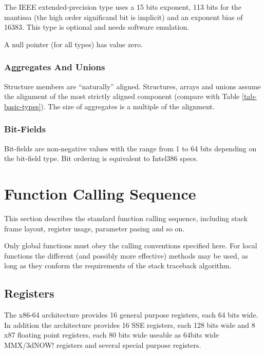 The IEEE extended-precision type uses a 15 bits exponent, 113 bits for
the mantissa (the high order significand bit is implicit) and an
exponent bias of 16383.  This type is optional and needs software
emulation.

A null pointer (for all types) has value zero.

\subsubsection{Aggregates And Unions}

Structure members are "`naturally"' aligned.  Structures, arrays and
unions assume the alignment of the most strictly aligned component
(compare with Table \ref{tab-basic-types}). The size of aggregates is
a multiple of the alignment.

\subsubsection{Bit-Fields}

Bit-fields are non-negative values with the range from 1 to 64 bits
depending on the bit-field type. Bit ordering is equivalent to
Intel386 specs.



\section{Function Calling Sequence}
This section describes the standard function calling sequence, including stack frame
layout, register usage, parameter pasing and so on.

Only global functions must obey the calling conventions specified here.  For local
functions the different (and possibly more effective) methods may be used, as long as they
conform the requirements of the stack traceback algorithm.

\subsection{Registers}
\label{subsec-registers}
The x86-64 architecture provides 16 general purpose registers, each 64 bits
wide. In addition the architecture provides 16 SSE registers, each 128 bits
wide and 8 x87 floating point registers, each 80 bits wide useable as 64bits
wide MMX/3dNOW! registers and several special purpose registers.

